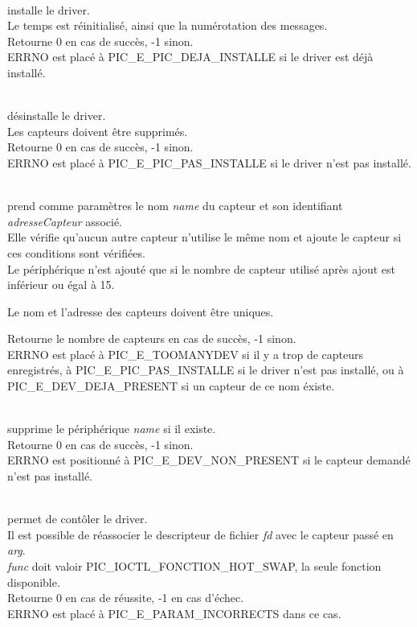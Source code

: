 \begin{m_desc}

 \item [PIC\_DrvInstall()] \hfill\\
installe le driver.\\
Le temps est réinitialisé, ainsi que la numérotation des messages.\\
Retourne 0 en cas de succès, -1 sinon.\\
ERRNO est placé à PIC\_E\_PIC\_DEJA\_INSTALLE si le driver est déjà 
installé.

 \item [PIC\_DrvRemove()] \hfill\\
désinstalle le driver.\\
Les capteurs doivent être supprimés.\\
Retourne 0 en cas de succès, -1 sinon.\\
ERRNO est placé à PIC\_E\_PIC\_PAS\_INSTALLE si le driver n'est pas 
installé.

 \item [PIC\_DevAdd(char *const name, char const adresseCapteur)] \hfill\\
 prend comme paramètres le nom \textsl{name} du capteur et son identifiant \textsl{adresseCapteur} associé.\\
 Elle vérifie qu'aucun autre 
capteur n'utilise le même nom et ajoute le capteur
 si ces conditions sont vérifiées.\\
Le périphérique n'est ajouté que si le nombre de capteur utilisé après ajout
 est inférieur ou égal à 15.

Le nom et l'adresse des capteurs doivent être uniques.

Retourne le nombre de capteurs en cas de succès, -1 sinon.\\
ERRNO est placé à PIC\_E\_TOOMANYDEV si il y a trop de capteurs
 enregistrés, à PIC\_E\_PIC\_PAS\_INSTALLE si le driver n'est pas installé,
ou à PIC\_E\_DEV\_DEJA\_PRESENT si un capteur de ce nom éxiste.

 \item [PIC\_DevDelete(char * name)] \hfill\\
supprime le périphérique \textsl{name} si il existe.\\
Retourne 0 en cas de succès, -1 sinon.\\
ERRNO est positionné à PIC\_E\_DEV\_NON\_PRESENT si le capteur demandé 
n'est pas installé.

\item [PIC\_ioctl(int fd, int func, int arg)]\hfill\\
permet de contôler le driver.\\
Il est possible de réassocier le descripteur de fichier \textsl{fd} avec le capteur passé en \textsl{arg}.\\
\textsl{func} doit valoir PIC\_IOCTL\_FONCTION\_HOT\_SWAP, la seule fonction disponible.\\
Retourne 0 en cas de réussite, -1 en cas d'échec.\\
ERRNO est placé à PIC\_E\_PARAM\_INCORRECTS dans ce cas.


\end{m_desc}

